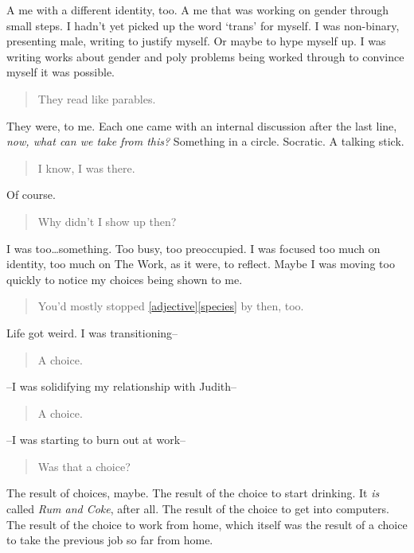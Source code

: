 A me with a different identity, too. A me that was working on gender through small steps. I hadn't yet picked up the word `trans' for myself. I was non-binary, presenting male, writing to justify myself. Or maybe to hype myself up. I was writing works about gender and poly problems being worked through to convince myself it was possible.

\begin{quote}
They read like parables.
\end{quote}

They were, to me. Each one came with an internal discussion after the last line, \emph{now, what can we take from this?} Something in a circle. Socratic. A talking stick.

\begin{quote}
I know, I was there.
\end{quote}

Of course.

\begin{quote}
Why didn't I show up then?
\end{quote}

I was too\ldots{}something. Too busy, too preoccupied. I was focused too much on identity, too much on The Work, as it were, to reflect. Maybe I was moving too quickly to notice my choices being shown to me.

\begin{quote}
You'd mostly stopped \href{https://adjectivespecies.com}{{[}adjective{]}{[}species{]}} by then, too.
\end{quote}

Life got weird. I was transitioning--

\begin{quote}
A choice.
\end{quote}

--I was solidifying my relationship with Judith--

\begin{quote}
A choice.
\end{quote}

--I was starting to burn out at work--

\begin{quote}
Was that a choice?
\end{quote}

The result of choices, maybe. The result of the choice to start drinking. It \emph{is} called \emph{Rum and Coke}, after all. The result of the choice to get into computers. The result of the choice to work from home, which itself was the result of a choice to take the previous job so far from home.


